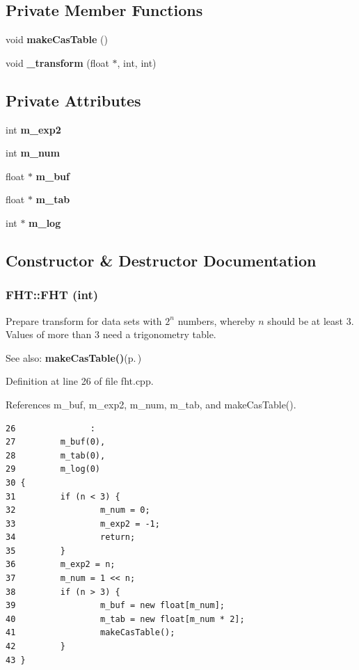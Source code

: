 \subsection*{Private Member Functions}
\begin{CompactItemize}
\item 
void {\bf make\-Cas\-Table} ()
\item 
void {\bf \_\-transform} (float $\ast$, int, int)
\end{CompactItemize}
\subsection*{Private Attributes}
\begin{CompactItemize}
\item 
int {\bf m\_\-exp2}
\item 
int {\bf m\_\-num}
\item 
float $\ast$ {\bf m\_\-buf}
\item 
float $\ast$ {\bf m\_\-tab}
\item 
int $\ast$ {\bf m\_\-log}
\end{CompactItemize}


\subsection{Constructor \& Destructor Documentation}
\subsubsection{\setlength{\rightskip}{0pt plus 5cm}FHT::FHT (int)}\label{classFHT_FHTa0}


Prepare transform for data sets with $2^n$ numbers, whereby $n$ should be at least 3. Values of more than 3 need a trigonometry table. \begin{Desc}
\item[See also:]{\bf make\-Cas\-Table()}{\rm (p.\,\pageref{classFHT_FHTd0})}\end{Desc}


Definition at line 26 of file fht.cpp.

References m\_\-buf, m\_\-exp2, m\_\-num, m\_\-tab, and make\-Cas\-Table().



\footnotesize\begin{verbatim}26               :
27         m_buf(0),
28         m_tab(0),
29         m_log(0)
30 {
31         if (n < 3) {
32                 m_num = 0;
33                 m_exp2 = -1;
34                 return;
35         }
36         m_exp2 = n;
37         m_num = 1 << n;
38         if (n > 3) {
39                 m_buf = new float[m_num];
40                 m_tab = new float[m_num * 2];
41                 makeCasTable();
42         }
43 }

\end{verbatim}\normalsize 


